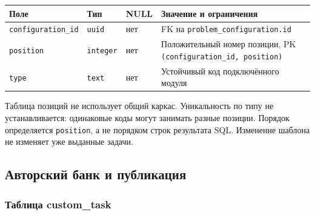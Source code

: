 \documentclass[12pt,a4paper]{article}
\newcounter{none} %
\begin{document}
\hypertarget{таблица-configuration_item}{}

{\def\LTcaptype{none} %
\begin{longtable}[]{@{}
  >{\raggedright\arraybackslash}p{}
  >{\raggedright\arraybackslash}p{}
  >{\raggedright\arraybackslash}p{}
  >{\raggedright\arraybackslash}p{}@{}}
\toprule\noalign{}
\begin{minipage}[b]{\linewidth}\raggedright
Поле
\end{minipage} & \begin{minipage}[b]{\linewidth}\raggedright
Тип
\end{minipage} & \begin{minipage}[b]{\linewidth}\raggedright
NULL
\end{minipage} & \begin{minipage}[b]{\linewidth}\raggedright
Значение и ограничения
\end{minipage} \\
\midrule\noalign{}
\endhead
\bottomrule\noalign{}
\endlastfoot
\texttt{configuration\_\allowbreak{}id} & \texttt{uuid} & нет & FK на \texttt{problem\_\allowbreak{}configuration.\allowbreak{}id} \\
\texttt{position} & \texttt{integer} & нет & Положительный номер позиции, PK \texttt{(configuration\_\allowbreak{}id, position)} \\
\texttt{type} & \texttt{text} & нет & Устойчивый код подключённого модуля \\
\end{longtable}
}

Таблица позиций не использует общий каркас. Уникальность по типу не устанавливается: одинаковые коды могут занимать разные позиции. Порядок определяется \texttt{position}, а не порядком строк результата SQL. Изменение шаблона не изменяет уже выданные задачи.

\subsection{Авторский банк и публикация}\label{ux430ux432ux442ux43eux440ux441ux43aux438ux439-ux431ux430ux43dux43a-ux438-ux43fux443ux431ux43bux438ux43aux430ux446ux438ux44f}

\hypertarget{авторский-банк-и-публикация}{}

\subsubsection{Таблица custom\_task}\label{ux442ux430ux431ux43bux438ux446ux430-custom_task}
\end{document}
